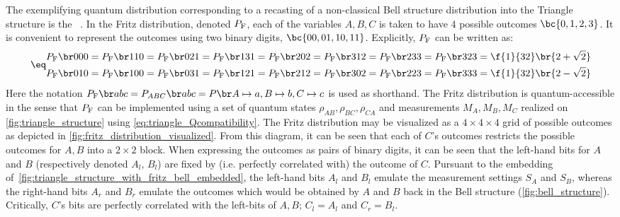 \documentclass[aps, 10pt, english, twoside, pra, nofootinbib, tightenlines, longbibliography, superscriptaddress]{revtex4-1}
\begin{document}
    The exemplifying quantum distribution corresponding to a recasting of a non-classical Bell structure distribution into the Triangle structure is the ~\cite{Fritz_2012}. In the Fritz distribution, denoted $\prob[\fritz]$, each of the variables $A,B,C$ is taken to have $4$ possible outcomes $\bc{0,1,2,3}$. It is convenient to represent the outcomes using two binary digits, $\bc{00,01,10,11}$. Explicitly, $\prob[\fritz]$ can be written as:
    \begin{align*}
    \eq \label{eq:fritz_dist}
    \begin{split}
        \prob[\fritz][000] = \prob[\fritz][110] = \prob[\fritz][021] = \prob[\fritz][131] = \prob[\fritz][202] = \prob[\fritz][312] = \prob[\fritz][233] = \prob[\fritz][323] &= \f{1}{32}\br{2 + \sqrt{2}} \\
        \prob[\fritz][010] = \prob[\fritz][100] = \prob[\fritz][031] = \prob[\fritz][121] = \prob[\fritz][212] = \prob[\fritz][302] = \prob[\fritz][223] = \prob[\fritz][333] &= \f{1}{32}\br{2 - \sqrt{2}}
    \end{split}
    \end{align*}
    Here the notation $\prob[\fritz][abc] = \prob[ABC][abc] = \prob[][A\mapsto a,B\mapsto b,C\mapsto c]$ is used as shorthand. The Fritz distribution is quantum-accessible in the sense that $\prob[\fritz]$ can be implemented using a set of quantum states $\rho_{AB}, \rho_{BC}, \rho_{CA}$ and measurements $M_A, M_B, M_C$ realized on \cref{fig:triangle_structure} using \cref{eq:triangle_Qcompatibility}.
    The Fritz distribution may be visualized as a $4 \times 4 \times 4$ grid of possible outcomes as depicted in \cref{fig:fritz_distribution_visualized}. From this diagram, it can be seen that each of $C$'s outcomes restricts the possible outcomes for $A,B$ into a $2 \times 2$ block. When expressing the outcomes as pairs of binary digits, it can be seen that the left-hand bits for $A$ and $B$ (respectively denoted $A_l$, $B_l$) are fixed by (i.e. perfectly correlated with) the outcome of $C$. Pursuant to the embedding of~\cref{fig:triangle_structure_with_fritz_bell_embedded}, the left-hand bits $A_l$ and $B_l$ emulate the measurement settings $S_{A}$ and $S_{B}$, whereas the right-hand bits $A_r$ and $B_r$ emulate the outcomes which would be obtained by $A$ and $B$ back in the Bell structure (\cref{fig:bell_structure}). Critically, $C$'s bits are perfectly correlated with the left-bits of $A,B$; $C_l = A_l$ and $C_r = B_l$.
\end{document}
